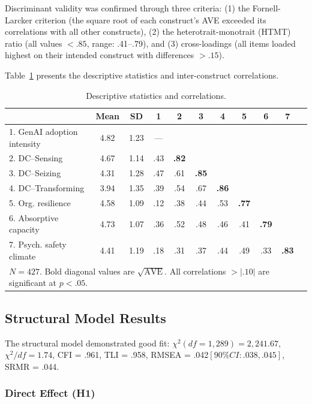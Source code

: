 \documentclass[12pt, a4paper]{article}
\begin{document}
Discriminant validity was confirmed through three criteria: (1) the Fornell-Larcker criterion (the square root of each construct's AVE exceeded its correlations with all other constructs), (2) the heterotrait-monotrait (HTMT) ratio (all values $< .85$, range: .41--.79), and (3) cross-loadings (all items loaded highest on their intended construct with differences $> .15$).

Table~\ref{tab:correlations} presents the descriptive statistics and inter-construct correlations.

\begin{table}[H]
\centering
\caption{Descriptive statistics and correlations.}
\label{tab:correlations}
\small
\begin{tabular}{lcccccccccc}
\toprule
& Mean & SD & 1 & 2 & 3 & 4 & 5 & 6 & 7 \\
\midrule
1. GenAI adoption intensity & 4.82 & 1.23 & --- &  &  &  &  &  & \\
2. DC--Sensing & 4.67 & 1.14 & .43 & \textbf{.82} &  &  &  &  & \\
3. DC--Seizing & 4.31 & 1.28 & .47 & .61 & \textbf{.85} &  &  &  & \\
4. DC--Transforming & 3.94 & 1.35 & .39 & .54 & .67 & \textbf{.86} &  &  & \\
5. Org. resilience & 4.58 & 1.09 & .12 & .38 & .44 & .53 & \textbf{.77} &  & \\
6. Absorptive capacity & 4.73 & 1.07 & .36 & .52 & .48 & .46 & .41 & \textbf{.79} & \\
7. Psych. safety climate & 4.41 & 1.19 & .18 & .31 & .37 & .44 & .49 & .33 & \textbf{.83} \\
\bottomrule
\multicolumn{11}{l}{\footnotesize $N = 427$. Bold diagonal values are $\sqrt{\text{AVE}}$. All correlations $> |.10|$ are significant at $p < .05$.}
\end{tabular}
\end{table}

\subsection{Structural Model Results}

The structural model demonstrated good fit: $\chi^2(df = 1,289) = 2,241.67$, $\chi^2/df = 1.74$, CFI = .961, TLI = .958, RMSEA = .042$ [90\% CI: .038, .045]$, SRMR = .044.

\subsubsection{Direct Effect (H1)}
\end{document}

